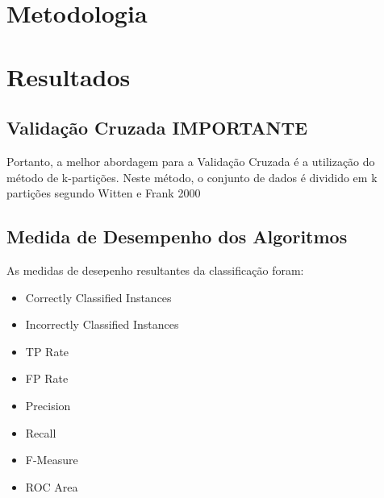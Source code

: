 \documentclass[
	12pt,				%
	openright,			%
	oneside,	
	a4paper,				%
	english,				%
	brazil				%
]{abntex2/abntex2} %
\begin{document}
\chapter{Metodologia}

	
		
		
	
		
\chapter{Resultados}

	\section{Validação Cruzada IMPORTANTE}
	
	Portanto, a melhor abordagem para a Validação Cruzada é a utilização do método de k-partições. Neste método, o conjunto de dados é dividido em k partições segundo Witten e Frank 2000

	\section{Medida de Desempenho dos Algoritmos}
	
	As medidas de desepenho resultantes da classificação foram: 
	
	\begin{itemize}
		\item Correctly Classified Instances
		\item Incorrectly Classified Instances
		\item TP Rate
		\item FP Rate
		\item Precision
		\item Recall
		\item F-Measure
		\item ROC Area
	\end{itemize}
	
\end{document}
